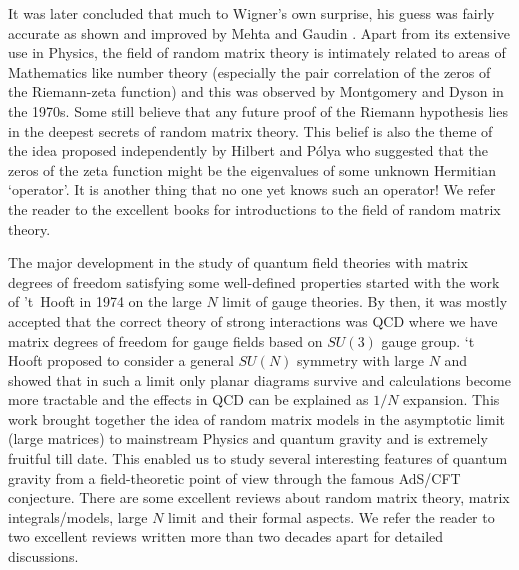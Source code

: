 \documentclass[11pt]{article}
\begin{document}
It was later concluded that much to Wigner's own surprise, 
his guess was fairly accurate as shown and improved by Mehta \cite{MEHTA1960395} and 
Gaudin \cite{GAUDIN1961447}. Apart from its extensive use in Physics, the field of random matrix theory is intimately related to areas of Mathematics like number theory 
(especially the pair correlation of the zeros of the Riemann-zeta function) and this was 
observed by Montgomery and Dyson in the 1970s. Some still believe that any future proof of the
Riemann hypothesis lies in the
deepest secrets of random matrix theory. This belief is also the theme of the idea proposed 
independently by  Hilbert and P\'{o}lya who suggested that the zeros of the zeta function 
might be the eigenvalues of some unknown Hermitian `operator'. It is another thing that 
no one yet knows such an operator! We refer the reader to the excellent books 
\cite{Meh2004, Akemann:2011csh} for introductions to the field of random matrix theory. 

The major development in the study of quantum field theories with matrix degrees of freedom satisfying some well-defined properties started with the work of 't~Hooft in 1974 on the large $N$ limit of gauge theories. By then, it was mostly accepted that the correct theory of 
strong interactions was QCD where we have matrix degrees of freedom for gauge fields based on $SU(3)$ gauge group. `t Hooft proposed to consider a general $SU(N)$ 
symmetry with large $N$ and showed that in such a limit only planar diagrams survive and calculations become more tractable and the effects in QCD can be explained as $1/N$ expansion. This work brought together the idea of random matrix models in the asymptotic limit (large matrices) to mainstream Physics and quantum gravity and is extremely fruitful till date. This enabled us to study several interesting features of quantum gravity 
from a field-theoretic point of view through the famous AdS/CFT conjecture.
There are some excellent reviews about random matrix theory, matrix integrals/models, large $N$ limit 
and their formal aspects. We refer the reader to two excellent reviews written more than two decades 
apart \cite{DiFrancesco:1993cyw,Eynard:2015aea} for detailed discussions. \\
\end{document}
